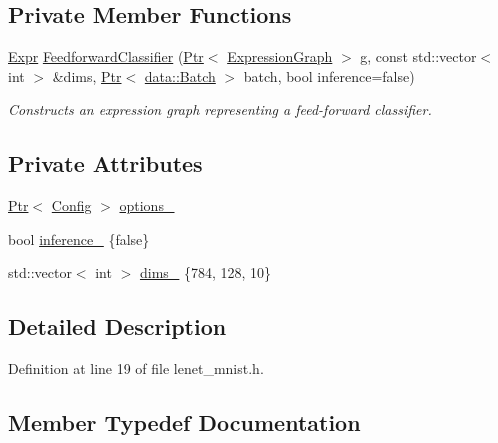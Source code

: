 \subsection*{Private Member Functions}
\begin{DoxyCompactItemize}
\item 
\hyperlink{namespacemarian_a498d8baf75b754011078b890b39c8e12}{Expr} \hyperlink{classmarian_1_1models_1_1LeNetModel_a7477e8409c126d83dae223d5cbd88f4c}{Feedforward\+Classifier} (\hyperlink{namespacemarian_ad1a373be43a00ef9ce35666145137b08}{Ptr}$<$ \hyperlink{classmarian_1_1ExpressionGraph}{Expression\+Graph} $>$ g, const std\+::vector$<$ int $>$ \&dims, \hyperlink{namespacemarian_ad1a373be43a00ef9ce35666145137b08}{Ptr}$<$ \hyperlink{classmarian_1_1data_1_1Batch}{data\+::\+Batch} $>$ batch, bool inference=false)
\begin{DoxyCompactList}\small\item\em Constructs an expression graph representing a feed-\/forward classifier. \end{DoxyCompactList}\end{DoxyCompactItemize}
\subsection*{Private Attributes}
\begin{DoxyCompactItemize}
\item 
\hyperlink{namespacemarian_ad1a373be43a00ef9ce35666145137b08}{Ptr}$<$ \hyperlink{classmarian_1_1Config}{Config} $>$ \hyperlink{classmarian_1_1models_1_1LeNetModel_aac415b744f64e6d89235f85e9004b2b8}{options\+\_\+}
\item 
bool \hyperlink{classmarian_1_1models_1_1LeNetModel_a0bd282c49c8ed3968e70f62ad2f9ea8a}{inference\+\_\+} \{false\}
\item 
std\+::vector$<$ int $>$ \hyperlink{classmarian_1_1models_1_1LeNetModel_adca279341514991bcb87b112eade2c68}{dims\+\_\+} \{784, 128, 10\}
\end{DoxyCompactItemize}


\subsection{Detailed Description}


Definition at line 19 of file lenet\+\_\+mnist.\+h.



\subsection{Member Typedef Documentation}
